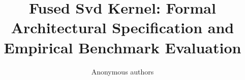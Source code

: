\title{\textbf{Fused Svd Kernel: Formal Architectural Specification and Empirical Benchmark Evaluation}}

\author{Anonymous authors}
